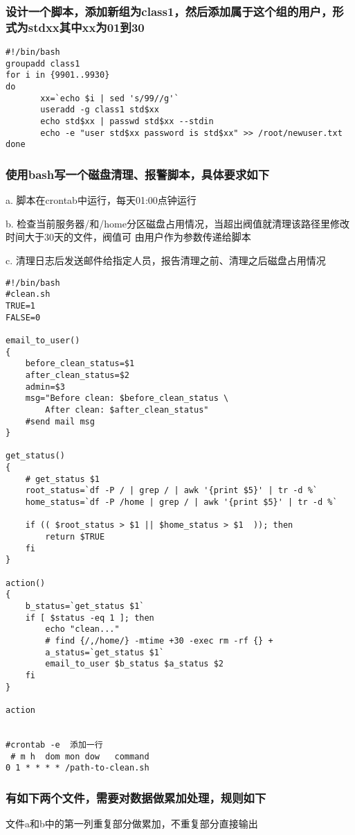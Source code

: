 \documentclass{article}
\begin{document}
\subsubsection{设计一个脚本，添加新组为class1，然后添加属于这个组的用户，形式为stdxx其中xx为01到30
 }
\begin{verbatim}
#!/bin/bash
groupadd class1
for i in {9901..9930}
do
       xx=`echo $i | sed 's/99//g'`
       useradd -g class1 std$xx
       echo std$xx | passwd std$xx --stdin
       echo -e "user std$xx password is std$xx" >> /root/newuser.txt
done

\end{verbatim}

\subsubsection{使用bash写一个磁盘清理、报警脚本，具体要求如下}
a. 脚本在crontab中运行，每天01:00点钟运行


b. 检查当前服务器/和/home分区磁盘占用情况，当超出阀值就清理该路径里修改时间大于30天的文件，阀值可
由用户作为参数传递给脚本


c. 清理日志后发送邮件给指定人员，报告清理之前、清理之后磁盘占用情况

\begin{verbatim}
#!/bin/bash
#clean.sh
TRUE=1
FALSE=0

email_to_user()
{
	before_clean_status=$1
	after_clean_status=$2
	admin=$3
	msg="Before clean: $before_clean_status \
		After clean: $after_clean_status"
	#send mail msg
}

get_status()
{
	# get_status $1
	root_status=`df -P / | grep / | awk '{print $5}' | tr -d %`
	home_status=`df -P /home | grep / | awk '{print $5}' | tr -d %`

	if (( $root_status > $1 || $home_status > $1  )); then
		return $TRUE 
	fi
}

action()
{
	b_status=`get_status $1`
	if [ $status -eq 1 ]; then
		echo "clean..."
		# find {/,/home/} -mtime +30 -exec rm -rf {} +
		a_status=`get_status $1`
		email_to_user $b_status $a_status $2
	fi
}

action


#crontab -e  添加一行
 # m h  dom mon dow   command
0 1 * * * * /path-to-clean.sh

\end{verbatim}

\subsubsection{有如下两个文件，需要对数据做累加处理，规则如下}
文件a和b中的第一列重复部分做累加，不重复部分直接输出
\end{document}
